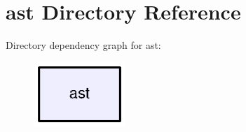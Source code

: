 \section{ast Directory Reference}
\label{dir_abffb41b2fb02e852dda76d88b79b6c6}
Directory dependency graph for ast\+:
\nopagebreak
\begin{figure}[H]
\begin{center}
\leavevmode
\includegraphics[width=98pt]{dir_abffb41b2fb02e852dda76d88b79b6c6_dep}
\end{center}
\end{figure}
